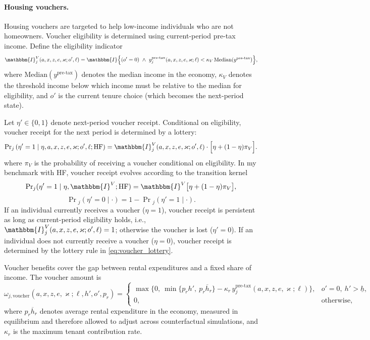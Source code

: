 \documentclass[parskip=full]{article}
\theoremstyle{plain}
\theoremstyle{definition}
\theoremstyle{remark}
\begin{document}
\paragraph{Housing vouchers.}
Housing vouchers are targeted to help low-income individuals who are not homeowners. Voucher eligibility is determined using current-period pre-tax income. Define the eligibility indicator
\begin{equation*}\label{eq:voucher_elig}
\mathbbm{I}_j^{V}(a,x,z,e,\varkappa;o',\ell)=
\mathbbm{I}\Big\{(o'=0)\ \land\ 
y_j^{\text{pre-tax}}(a,x,z,e,\varkappa;\ell)
<\kappa_V\,\text{Median}(y^{\text{pre-tax}})
\Big\},
\end{equation*}
where $\text{Median}(y^{\text{pre-tax}})$ denotes the median income in the economy, $\kappa_V$ denotes the threshold income below which income must be relative to the median for eligibility, and $o'$ is the current tenure choice (which becomes the next-period state).

Let $\eta'\in\{0,1\}$ denote next-period voucher receipt. Conditional on eligibility, voucher receipt for the next period is determined by a lottery:
\begin{equation}\label{eq:voucher_lottery}
\Pr\!_j\left(\eta'=1 \mid \eta,a,x,z,e,\varkappa;o',\ell;\text{HF}\right)=
\mathbbm{I}_j^{V}(a,x,z,e,\varkappa;o',\ell)\cdot\Big[\eta+(1-\eta)\pi_V\Big].
\end{equation}
where $\pi_V$ is the probability of receiving a voucher conditional on eligibility. In my benchmark with HF, voucher receipt evolves according to the transition kernel
\[\Pr\!_j(\eta'=1\mid \eta,\mathbbm{I}^V;\text{HF})
=\mathbbm{I}^V\big[\eta+(1-\eta)\pi_V\big],\] \[
\Pr\!_j(\eta'=0\mid \cdot)=1-\Pr\!_j(\eta'=1\mid \cdot).\]
If an individual currently receives a voucher ($\eta=1$), voucher receipt is persistent as long as current-period eligibility holds, i.e., $\mathbbm{I}_j^{V}(a,x,z,e,\varkappa;o',\ell)=1$; otherwise the voucher is lost ($\eta'=0$). If an individual does not currently receive a voucher ($\eta=0$), voucher receipt is determined by the lottery rule in \eqref{eq:voucher_lottery}.

Voucher benefits cover the gap between rental expenditures and a fixed share of income. The voucher amount is
\begin{equation*}
\label{eq:voucher_amount}
\omega_{j,\text{voucher}}(a,x,z,e,\varkappa;\ell,h',o',p_r)=
\begin{cases}
\displaystyle
\max\Big\{0,\ \min\{p_r h',\ p_r \overline{h}_r\}
-\kappa_r \,y_j^{\text{pre-tax}}(a,x,z,e,\varkappa;\ell)\Big\},
& o'=0,\ h'>\underline h,\\[1.2ex]
0, & \text{otherwise},
\end{cases}
\end{equation*}
where $p_r \overline{h}_r$ denotes average rental expenditure in the economy, measured in equilibrium and therefore allowed to adjust across counterfactual simulations, and $\kappa_r$ is the maximum tenant contribution rate. 
\end{document}
